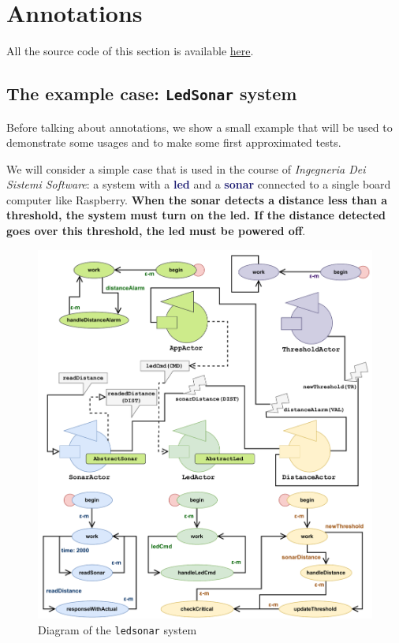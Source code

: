 \section{Annotations}

All the source code of this section is available \href{https://github.com/LM-96/QA-Extensions/tree/main/it.unibo.qakactor/src/main/kotlin/annotations}{here}.

\subsection{The example case: \texttt{LedSonar} system}

Before talking about annotations, we show a small example that will be used to demonstrate some usages and to make some first approximated tests.

We will consider a simple case that is used in the course of \emph{Ingegneria Dei Sistemi Software}: a system with a \textcolor{MidnightBlue}{\textbf{led}} and a \textcolor{MidnightBlue}{\textbf{sonar}} connected to a single board computer like Raspberry.
\textbf{When the sonar detects a distance less than a threshold, the system must turn on the led. If the distance detected goes over this threshold, the led must be powered off}.

\begin{figure}[h]
	\centering
	\includegraphics[width=\textwidth]{img/[EG]led_sonar_actor_diagram}
	\caption{Diagram of the \texttt{ledsonar} system}
	\label{fig::ledsonar_system}
\end{figure}


